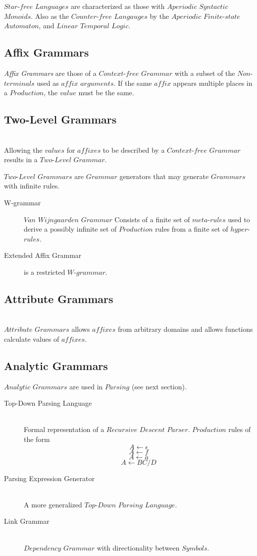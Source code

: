 \documentclass{article}
\begin{document}
$Star$-$free$ $Languages$ are characterized as those with $Aperiodic$
$Syntactic$ $Monoids$. Also as the $Counter$-$free$ $Langauges$ by the
$Aperiodic$ $Finite$-$state$ $Automaton$, and $Linear$ $Temporal$
$Logic$.

\subsection{Affix Grammars}

\emph{Affix Grammars} are those of a $Context$-$free$ $Grammar$ with a
subset of the $Non$-$terminals$ used as $affix$ $arguments$. If the
same $affix$ appears multiple places in a $Production$, the $value$
must be the same.

\subsection{Two-Level Grammars} \hfill \\
Allowing the $values$ for $affixes$ to be described by a
$Context$-$free$ $Grammar$ results in a $Two$-$Level$ $Grammar$.

$Two$-$Level$ $Grammars$ are $Grammar$ generators that may generate
$Grammars$ with infinite rules.

\begin{description}
\item[W-grammar] $Van$ $Wijngaarden$ $Grammar$ Consists of a finite
  set of $meta$-$rules$ used to derive a possibly infinite set of
  $Production$ rules from a finite set of $hyper$-$rules$.
\item[Extended Affix Grammar] is a restricted $W$-$grammar$.
\end{description}

\subsection{Attribute Grammars} \hfill \\
$Attribute$ $Grammars$ allows $affixes$ from arbitrary domains and
allows functions calculate values of $affixes$.

\subsection{Analytic Grammars}

$Analytic$ $Grammars$ are used in $Parsing$ (see next section).

\begin{description}
\item[Top-Down Parsing Language] \hfill \\
Formal representation of a $Recursive$ $Descent$
$Parser$. $Production$ rules of the form
\[
    A \leftarrow \epsilon
\]\[
    A \leftarrow f
\]\[
    A \leftarrow a
\]\[
    A \leftarrow BC/D
\]
\item[Parsing Expression Generator] \hfill \\
A more generalized $Top$-$Down$ $Parsing$ $Language$.
\item[Link Grammar] \hfill \\
$Dependency$ $Grammar$ with directionality between $Symbols$.
\end{description}
\end{document}
